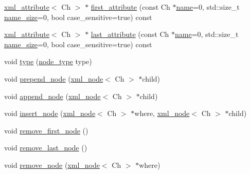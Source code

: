 \begin{DoxyCompactItemize}
\item 
\mbox{\hyperlink{classrapidxml_1_1xml__attribute}{xml\+\_\+attribute}}$<$ Ch $>$ $\ast$ \mbox{\hyperlink{classrapidxml_1_1xml__node_ab816ab6f13ee4b0588d5b76b0697511c}{first\+\_\+attribute}} (const Ch $\ast$\mbox{\hyperlink{classrapidxml_1_1xml__base_aef8ae147fbee59209f714274afc80dc4}{name}}=0, std\+::size\+\_\+t \mbox{\hyperlink{classrapidxml_1_1xml__base_a20c8ffbe0c7a0b4231681ab8b99330a4}{name\+\_\+size}}=0, bool case\+\_\+sensitive=true) const
\item 
\mbox{\hyperlink{classrapidxml_1_1xml__attribute}{xml\+\_\+attribute}}$<$ Ch $>$ $\ast$ \mbox{\hyperlink{classrapidxml_1_1xml__node_a67db03d1568dc6891573210ddba61520}{last\+\_\+attribute}} (const Ch $\ast$\mbox{\hyperlink{classrapidxml_1_1xml__base_aef8ae147fbee59209f714274afc80dc4}{name}}=0, std\+::size\+\_\+t \mbox{\hyperlink{classrapidxml_1_1xml__base_a20c8ffbe0c7a0b4231681ab8b99330a4}{name\+\_\+size}}=0, bool case\+\_\+sensitive=true) const
\item 
void \mbox{\hyperlink{classrapidxml_1_1xml__node_a499bbc9300c1b06821d5c08b24164c68}{type}} (\mbox{\hyperlink{rapidxml_8hpp_abb456db38f7efb746c4330eed6072a7c}{node\+\_\+type}} type)
\item 
void \mbox{\hyperlink{classrapidxml_1_1xml__node_ae86e92908c3eab40bbed8216e4f3f3cb}{prepend\+\_\+node}} (\mbox{\hyperlink{classrapidxml_1_1xml__node}{xml\+\_\+node}}$<$ Ch $>$ $\ast$child)
\item 
void \mbox{\hyperlink{classrapidxml_1_1xml__node_a8696d098ecc9c4d2a646b43e91d58e31}{append\+\_\+node}} (\mbox{\hyperlink{classrapidxml_1_1xml__node}{xml\+\_\+node}}$<$ Ch $>$ $\ast$child)
\item 
void \mbox{\hyperlink{classrapidxml_1_1xml__node_a666880f42a7e486d78cc45ed51c7c46d}{insert\+\_\+node}} (\mbox{\hyperlink{classrapidxml_1_1xml__node}{xml\+\_\+node}}$<$ Ch $>$ $\ast$where, \mbox{\hyperlink{classrapidxml_1_1xml__node}{xml\+\_\+node}}$<$ Ch $>$ $\ast$child)
\item 
void \mbox{\hyperlink{classrapidxml_1_1xml__node_a62bf7b276cf7a651a3337f5e0a0ef6ac}{remove\+\_\+first\+\_\+node}} ()
\item 
void \mbox{\hyperlink{classrapidxml_1_1xml__node_a9182512e948ec451a83f116cce7c7674}{remove\+\_\+last\+\_\+node}} ()
\item 
\mbox{\label{classrapidxml_1_1xml__node_a98289923eb9e8889418a9eb0207ea35c}} 
void \mbox{\hyperlink{classrapidxml_1_1xml__node_a98289923eb9e8889418a9eb0207ea35c}{remove\+\_\+node}} (\mbox{\hyperlink{classrapidxml_1_1xml__node}{xml\+\_\+node}}$<$ Ch $>$ $\ast$where)

\end{DoxyCompactItemize}
